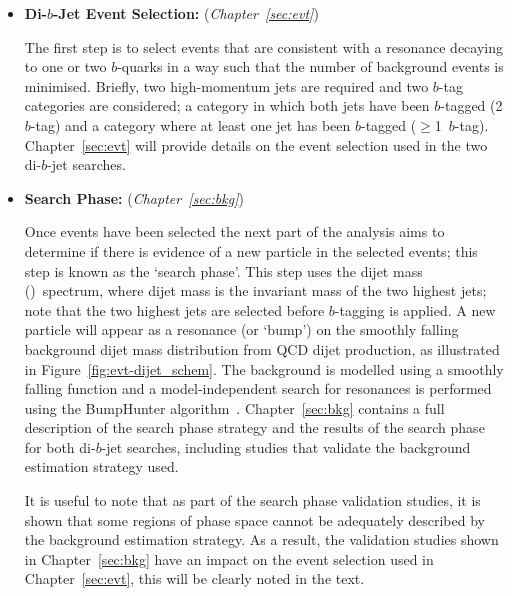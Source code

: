 \begin{itemize}[leftmargin=*]
\item\textbf{Di-$b$-Jet Event Selection:} (\textit{Chapter~\ref{sec:evt}})
  

  \vspace{0.5em}
  The first step is to select events that are consistent with a resonance decaying to one or two $b$-quarks
  in a way such that the number of background events is minimised.
  Briefly, two high-momentum jets are required and two $b$-tag categories are considered;
  a category in which both jets have been $b$-tagged (2 $b$-tag) and a category where at least one jet has been $b$-tagged ($\geq$1~$b$-tag).
  Chapter~\ref{sec:evt} will provide details on %
  the event selection used in the two di-$b$-jet searches.
  \vspace{1em}

\item\textbf{Search Phase:} (\textit{Chapter~\ref{sec:bkg}})

  \vspace{0.5em}
  Once events have been selected the next part of the analysis aims to determine if there
  is evidence of a new particle in the selected events; this step is known as the `search phase'.
  This step uses the dijet mass (\mjj)~spectrum, where dijet mass is the invariant mass of the two highest \pT{} jets;
  note that the two highest \pT{} jets are selected before $b$-tagging is applied.
  A new particle will appear as a resonance (or `bump') on the smoothly falling background
  dijet mass distribution from QCD dijet production, as illustrated in Figure~\ref{fig:evt-dijet_schem}.
  The background is modelled using a smoothly falling function and a
  model-independent search for resonances is performed using the {\sc BumpHunter} algorithm~\cite{dibjet-bh}.
  Chapter~\ref{sec:bkg} contains a full description of the search phase strategy and the results of the search phase for both di-$b$-jet searches,
  including studies that validate the background estimation strategy used.

  \vspace{1em}
  
  It is useful to note that as part of the search phase validation studies,
  it is shown that some regions of phase space cannot be adequately described by the background estimation strategy.
  As a result, the validation studies shown in Chapter~\ref{sec:bkg} have an impact on the event selection used in Chapter~\ref{sec:evt},
  this will be clearly noted in the text. 
 

\end{itemize}
